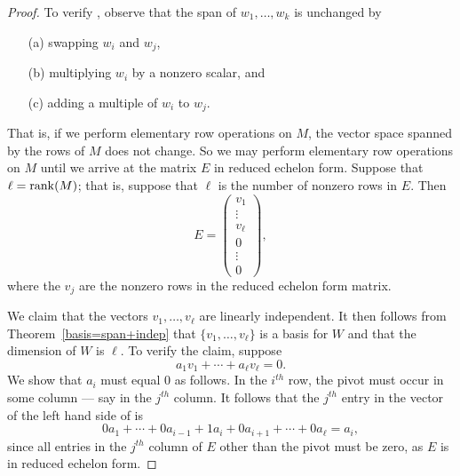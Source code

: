 \documentclass{ximera}
\begin{document}
\begin{proof} To verify , observe that the span of
$w_1,\ldots,w_k$ is unchanged by
\begin{itemize}
\item[(a)] swapping $w_i$ and $w_j$,
\item[(b)] multiplying $w_i$ by a nonzero scalar, and
\item[(c)] adding a multiple of $w_i$ to $w_j$.
\end{itemize}
That is, if we perform elementary row operations on $M$, the
vector space spanned by the rows of $M$ does not change. So we
may perform elementary row operations on $M$ until we arrive at
the matrix $E$ in reduced echelon form.   
Suppose that $\ell={\rm rank}(M)$; that is, suppose that $\ell$
is the number of nonzero rows in $E$.  Then
\[
E =\left(\begin{array}{c} v_1\\ \vdots \\v_\ell\\ 0 \\ \vdots
\\ 0 \end{array}\right),
\]
where the $v_j$ are the nonzero rows in the reduced echelon form
matrix.

We claim that the vectors $v_1,\ldots,v_\ell$ are linearly
independent.  It then follows from Theorem~\ref{basis=span+indep} that
$\{v_1,\ldots,v_\ell\}$ is a basis for $W$ and that the dimension of
$W$ is $\ell$.  To verify the claim, suppose
\begin{equation} \label{e:rowsums}
a_1v_1 + \cdots + a_\ell v_\ell = 0.
\end{equation}
We show that $a_i$ must equal $0$ as follows.  In the $i^{th}$
row, the pivot must occur in some column --- say in the $j^{th}$
column.  It follows that the $j^{th}$ entry in the vector of the
left hand side of  is
\[
0a_1 + \cdots + 0a_{i-1} +1a_i + 0a_{i+1} + \cdots + 0a_\ell =
a_i,
\]
since all entries in the $j^{th}$ column of $E$ other than the
pivot must be zero, as $E$ is in reduced echelon form.  \end{proof}
\end{document}

